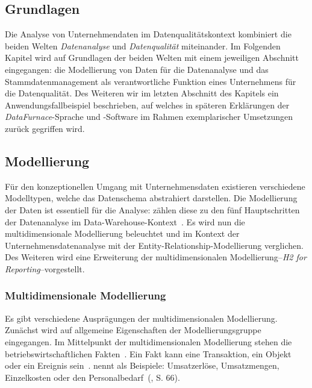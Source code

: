 \documentclass[
  language=german, %
  type=bachelor,%
  ngerman
]{isthesis}
\begin{document}
\begin{content}
  \chapter{Grundlagen}\label{ch:grundlagen}
  

  Die Analyse von Unternehmendaten im Datenqualitätskontext kombiniert die
  beiden Welten \textit{Datenanalyse} und \textit{Datenqualität} miteinander.
  Im Folgenden Kapitel wird auf Grundlagen der beiden Welten mit einem
  jeweiligen Abschnitt eingegangen: die Modellierung von Daten für die
  Datenanalyse und das Stammdatenmanagement als verantwortliche Funktion eines
  Unternehmens für die Datenqualität. Des Weiteren wir im letzten Abschnitt des
  Kapitels ein Anwendungsfallbeispiel beschrieben, auf welches in späteren
  Erklärungen der \textit{DataFurnace}-Sprache und -Software im Rahmen
  exemplarischer Umsetzungen zurück gegriffen wird.

  \section{Modellierung}\label{sec:modellierung}

  Für den konzeptionellen Umgang mit Unternehmensdaten existieren verschiedene
  Modelltypen, welche das Datenschema abstrahiert darstellen.  Die Modellierung
  der Daten ist essentiell für die Analyse:
  \textsc{\citeauthor{phipps2002automating}} zählen diese zu den fünf
  Hauptschritten der Datenanalyse im Data-Warehouse-Kontext~\cite[][S.
  1]{phipps2002automating}. Es wird nun die multidimensionale Modellierung
  beleuchtet und im Kontext der Unternehmensdatenanalyse mit der
  Entity-Relationship-Modellierung verglichen. Des Weiteren wird eine
  Erweiterung der multidimensionalen Modellierung--\textit{H2 for
  Reporting}--vorgestellt.


  \subsection{Multidimensionale
  Modellierung}\label{subsec:multidimensionale-modellierung} 

  Es gibt verschiedene Ausprägungen der multidimensionalen Modellierung.
  Zunächst wird auf allgemeine Eigenschaften der Modellierungsgruppe
  eingegangen. Im Mittelpunkt der multidimensionalen Modellierung stehen die
  betriebswirtschaftlichen Fakten~\cite[][S.  2]{phipps2002automating}. Ein
  Fakt kann eine Transaktion, ein Objekt oder ein Ereignis sein~\cite[][S.
  42]{ballard1998data}. \textsc{\citeauthor{Kemper2010}} nennt als Beispiele:
  \glqq{}Umsatzerlöse, Umsatzmengen, Einzelkosten oder den
  Personalbedarf\grqq{}~(\citeyear{Kemper2010}, S. 66). 


\end{content}
\end{document}
